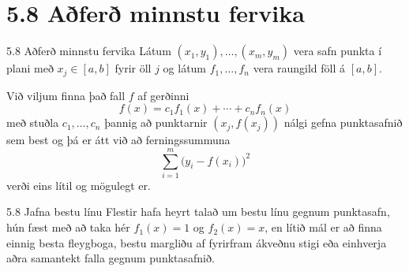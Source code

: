 
\section*{5.8 Aðferð minnstu fervika}

\begin{frame}{5.8  Aðferð minnstu fervika} 
Látum $(x_1,y_1),\dots,(x_m,y_m)$ vera safn punkta í plani með $x_j\in
[a,b]$ fyrir öll $j$ og látum $f_1,\dots,f_n$ vera raungild föll á
$[a,b]$.  

\pause
\smallskip
Við viljum finna það fall $f$ af gerðinni  
\begin{equation*}
	f(x)=c_1f_1(x) + \cdots + c_nf_n(x)
\end{equation*}
með stuðla $c_1, \ldots, c_n$ þannig að  punktarnir
$(x_j,f(x_j))$ nálgi gefna punktasafnið sem best og þá er átt við að 
ferningssummuna 
\begin{equation*}
	\sum_{i=1}^m\big(y_i-f(x_i)\big)^2
\end{equation*}
verði eins lítil og mögulegt er.
\end{frame}

\begin{frame}{5.8 Jafna bestu línu}
Flestir hafa heyrt talað um bestu línu gegnum punktasafn, hún fæst með
að taka hér $f_1(x) = 1$ og $f_2(x) = x$, en lítið mál er að finna
einnig besta fleygboga, bestu margliðu af fyrirfram ákveðnu stigi eða
einhverja aðra samantekt falla gegnum punktasafnið.  
\end{frame}

